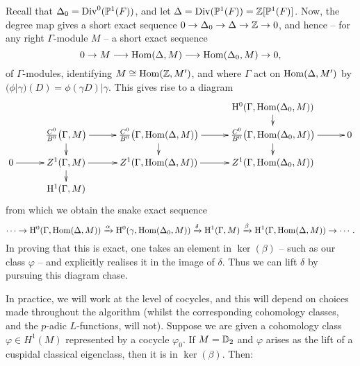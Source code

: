 \documentclass[a4paper,10pt]{article}
\numberwithin{equation}{section}
\begin{document}
Recall that $\Delta_0 = \mathrm{Div}^0(\mathbb{P}^1(F))$, and let $\Delta = \mathrm{Div}(\mathbb{P}^1(F)) = \mathbb{Z}[\mathbb{P}^1(F)]$. Now, the degree map gives a short exact sequence $0 \to \Delta_0 \to \Delta \to \mathbb{Z} \to 0$, and hence -- for any right $\Gamma$-module $M$ -- a short exact sequence
\[
	0 \to M \longrightarrow \mathrm{Hom}(\Delta,M) \longrightarrow \mathrm{Hom}(\Delta_0,M) \to 0,
\]
of $\Gamma$-modules, identifying $M \cong \mathrm{Hom}(\mathbb{Z},M')$, and where $\Gamma$ act on $\mathrm{Hom}(\Delta,M')$ by $(\phi|\gamma)(D) = \phi(\gamma D)|\gamma$. This gives rise to a diagram
\[
	\xymatrix@C=10mm@R=4mm{
		& & & \h^0(\Gamma,\Hom(\Delta_0,M))\ar[d] &\\
			 & \frac{C^0}{B^0}\big(\Gamma,M\big)\ar[r]\ar[d]   & \frac{C^0}{B^0}\big(\Gamma,\Hom(\Delta,M)\big)\ar[r]\ar[d] &  \frac{C^0}{B^0}\big(\Gamma,\Hom(\Delta_0,M)\big)\ar[r]\ar[d] &0\\
	0 \ar[r]  & Z^1(\Gamma,M)  \ar[r]\ar[d] & Z^1(\Gamma,\Hom(\Delta,M))  \ar[r] & Z^1(\Gamma,\Hom(\Delta_0,M)) &\\
	& \h^1(\Gamma,M) & & & \\
}
\]
from which we obtain the snake exact sequence
\[
\cdots \to \mathrm{H}^0(\Gamma,\mathrm{Hom}(\Delta,M)) \xrightarrow{\alpha} \mathrm{H}^0(\gamma,\mathrm{Hom}(\Delta_0,M)) \xrightarrow{\delta} \mathrm{H}^1(\Gamma,M) \xrightarrow{\beta} \mathrm{H}^1(\Gamma,\mathrm{Hom}(\Delta,M)) \to \cdots.
\]
In proving that this is exact, one takes an element in $\ker(\beta)$ -- such as our class $\varphi$ -- and explicitly realises it in the image of $\delta$. Thus we can lift $\delta$ by pursuing this diagram chase.

In practice, we will work at the level of cocycles, and this will depend on choices made throughout the algorithm (whilst the corresponding cohomology classes, and the $p$-adic $L$-functions, will not). Suppose we are given a cohomology class $\varphi \in H^1(M)$ represented by a cocycle $\varphi_0$. If $M = \mathbb{D}_2$ and $\varphi$ arises as the lift of a cuspidal classical eigenclass, then it is in $\ker(\beta)$. Then:
\end{document}
